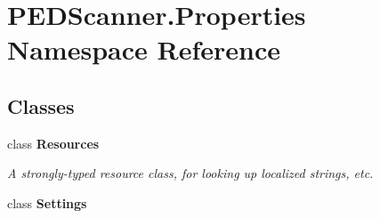 \hypertarget{namespace_p_e_d_scanner_1_1_properties}{}\section{P\+E\+D\+Scanner.\+Properties Namespace Reference}
\label{namespace_p_e_d_scanner_1_1_properties}
\subsection*{Classes}
\begin{DoxyCompactItemize}
\item 
class {\bfseries Resources}
\begin{DoxyCompactList}\small\item\em A strongly-\/typed resource class, for looking up localized strings, etc. \end{DoxyCompactList}\item 
class {\bfseries Settings}
\end{DoxyCompactItemize}
